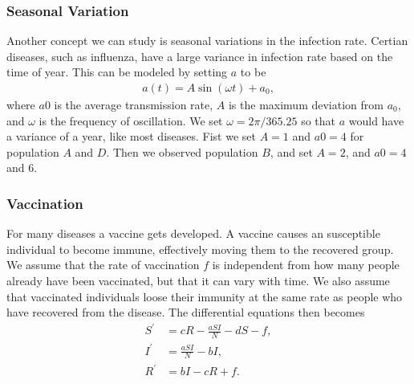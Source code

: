 \documentclass[a4paper]{article}
\let\Oldsubsubsection\subsubsection
\renewcommand{\subsubsection}{\FloatBarrier\Oldsubsubsection}
\begin{document}
\subsubsection{Seasonal Variation}

Another concept we can study is seasonal variations in the infection rate. Certian diseases, such as influenza, have a large variance in infection rate based on the time of year. This can be modeled by setting $a$ to be
\begin{align}
a ( t ) = A \sin ( \omega t ) + a _ { 0 },
\end{align}
where $a0$ is the average transmission rate, $A$ is the maximum deviation from $a_0$, and $\omega$ is the frequency of oscillation. We set $\omega = 2 \pi/365.25$ so that $a$ would have a variance of a year, like most diseases. Fist we set $A=1$ and $a0=4$ for population $A$ and $D$. Then we observed population $B$, and set $A=2$, and $a0=4$ and $6$. 


\subsubsection{Vaccination}

For many diseases a vaccine gets developed. A vaccine causes an susceptible individual to become immune, effectively moving them to the recovered group. We assume that the rate of vaccination $f$ is independent from how many people already have been vaccinated, but that it can vary with time. We also assume that vaccinated individuals loose their immunity at the same rate as people who have recovered from the disease. The differential equations then becomes
\begin{align} 
S ^ { \prime } & = c R - \frac { a S I } { N } - d S -f, \\ 
I ^ { \prime } & = \frac { a S I } { N } - b I , \\ 
R ^ { \prime } & = b I - c R + f.
\end{align}
\end{document}
